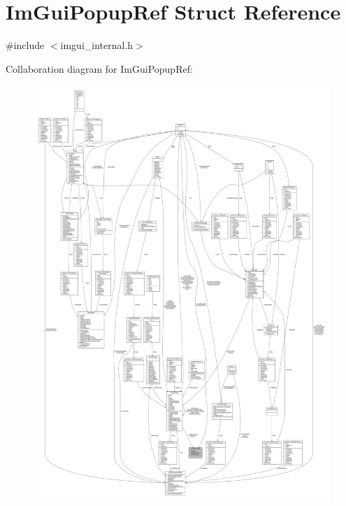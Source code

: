\hypertarget{struct_im_gui_popup_ref}{}\section{Im\+Gui\+Popup\+Ref Struct Reference}
\label{struct_im_gui_popup_ref}


{\ttfamily \#include $<$imgui\+\_\+internal.\+h$>$}



Collaboration diagram for Im\+Gui\+Popup\+Ref\+:
\nopagebreak
\begin{figure}[H]
\begin{center}
\leavevmode
\includegraphics[width=350pt]{struct_im_gui_popup_ref__coll__graph}
\end{center}
\end{figure}
